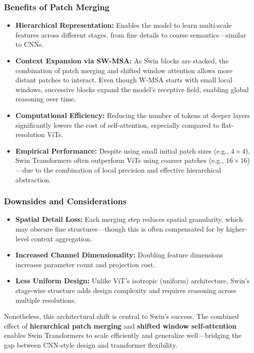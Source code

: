 \newpage

\subsubsection*{Benefits of Patch Merging}
\begin{itemize}
    \item \textbf{Hierarchical Representation:} Enables the model to learn multi-scale features across different stages, from fine details to coarse semantics—similar to CNNs.
    \item \textbf{Context Expansion via SW-MSA:} As Swin blocks are stacked, the combination of patch merging and shifted window attention allows more distant patches to interact. Even though W-MSA starts with small local windows, successive blocks expand the model’s receptive field, enabling global reasoning over time.
    \item \textbf{Computational Efficiency:} Reducing the number of tokens at deeper layers significantly lowers the cost of self-attention, especially compared to flat-resolution ViTs.
    \item \textbf{Empirical Performance:} Despite using small initial patch sizes (e.g., \(4 \times 4\)), Swin Transformers often outperform ViTs using coarser patches (e.g., \(16 \times 16\))—due to the combination of local precision and effective hierarchical abstraction.
\end{itemize}

\subsubsection*{Downsides and Considerations}
\begin{itemize}
    \item \textbf{Spatial Detail Loss:} Each merging step reduces spatial granularity, which may obscure fine structures—though this is often compensated for by higher-level context aggregation.
    \item \textbf{Increased Channel Dimensionality:} Doubling feature dimensions increases parameter count and projection cost.
    \item \textbf{Less Uniform Design:} Unlike ViT’s isotropic (uniform) architecture, Swin’s stage-wise structure adds design complexity and requires reasoning across multiple resolutions.
\end{itemize}

\noindent
Nonetheless, this architectural shift is central to Swin’s success. The combined effect of \textbf{hierarchical patch merging} and \textbf{shifted window self-attention} enables Swin Transformers to scale efficiently and generalize well—bridging the gap between CNN-style design and transformer flexibility.

